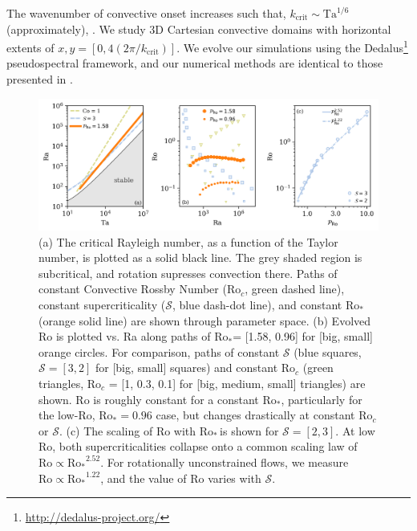 \documentclass[twocolumn, amsmath, amsfonts, amssymb]{aastex62}
\newcommand{\pro}{\ensuremath{\text{Ro}_{\text{*}}}}
\newcommand{\con}{\ensuremath{\text{Ro}_{c}}}
\newcommand{\gv}[1]{{\color{blue} #1}}
\begin{document}
\gv{The wavenumber of convective onset increases such that, $k_{\text{crit}} \sim \text{Ta}^{1/6}$ (approximately), \citep{Chandrasekhar,calkins&all2015a}.}
We study 3D Cartesian convective domains with horizontal extents of
$x, y = [0, 4(2\pi/k_{\text{crit}})]$. 
We evolve our simulations using the Dedalus\footnote{\url{http://dedalus-project.org/}} 
pseudospectral framework, and our numerical methods are identical to those presented
in \AB.

\begin{figure}[t!]
    \includegraphics[width=\textwidth]{parameter_space.png}
    \caption{(a) The critical Rayleigh number, as a function of the Taylor number, 
    is plotted as a solid black line. The grey shaded region is subcritical, and rotation
    supresses convection there. Paths of constant Convective Rossby Number
    ($\con$, green dashed line), constant supercriticality ($\mathcal{S}$, blue dash-dot line), and 
    constant \pro (orange solid line) are shown through parameter space. 
    (b) Evolved Ro is plotted vs. Ra along paths of \pro = [1.58, 0.96] for [big, small] orange circles.
    For comparison, paths of constant $\mathcal{S}$ (blue squares, $\mathcal{S} = [3,2]$ 
    for [big, small] squares)
    and constant $\con$ (green triangles, $\con$ = [1, 0.3, 0.1] for [big, medium, small] triangles) are shown.
    Ro is roughly constant for a constant \pro, particularly for the low-Ro, $\pro=0.96$ case, 
    but changes drastically at constant $\con$ or $\mathcal{S}$.
    (c) The scaling of Ro with \pro$\,$is shown for $\mathcal{S} = [2,3]$.
    At low Ro, both supercriticalities collapse onto a common scaling law of $\text{Ro}\propto\pro^{2.52}$.
    For rotationally unconstrained flows, we measure $\text{Ro}\propto\pro^{1.22}$, and the value of Ro varies with $\mathcal{S}$.
    \label{fig:parameter_space} }
\end{figure}
\end{document}
